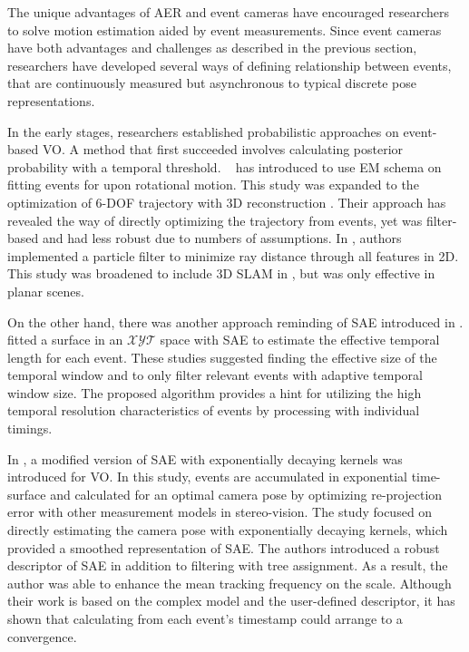 The unique advantages of \ac{AER} and event cameras have encouraged researchers to solve motion estimation aided by event measurements. Since event cameras have both advantages and challenges as described in the previous section, researchers have developed several ways of defining relationship between events, that are continuously measured but asynchronous to typical discrete pose representations.

In the early stages, researchers established probabilistic approaches on event-based \ac{VO}. A method that first succeeded involves calculating posterior probability with a temporal threshold. \citeauthor{kim2008simultaneous}~\cite{kim2008simultaneous} has introduced to use \ac{EM} schema on fitting events for upon rotational motion. This study was expanded to the optimization of 6-\ac{DOF} trajectory with 3D reconstruction \cite{kim2016real}. Their approach has revealed the way of directly optimizing the trajectory from events, yet was filter-based and had less robust due to numbers of assumptions. In \cite{weikersdorfer2012event}, authors implemented a particle filter to minimize ray distance through all features in 2D. This study was broadened to include 3D \ac{SLAM} in \cite{weikersdorfer2013simultaneous}, but was only effective in planar scenes.

On the other hand, there was another approach reminding of \ac{SAE} introduced in \cite{adelson1985spatiotemporal}. \cite{mueggler2015lifetime} fitted a surface in an $\mathcal{XYT}$ space with \ac{SAE} to estimate the effective temporal length for each event. These studies suggested finding the effective size of the temporal window and to only filter relevant events with adaptive temporal window size. The proposed algorithm provides a hint for utilizing the high temporal resolution characteristics of events by processing with individual timings.

In \cite{ieng2018neuromorphic}, a modified version of \ac{SAE} with exponentially decaying kernels was introduced for \ac{VO}. In this study, events are accumulated in exponential time-surface and calculated for an optimal camera pose by optimizing re-projection error with other measurement models in stereo-vision. The study focused on directly estimating the camera pose with exponentially decaying kernels, which provided a smoothed representation of \ac{SAE}. The authors introduced a robust descriptor of \ac{SAE} in addition to filtering with tree assignment. As a result, the author was able to enhance the mean tracking frequency on the scale. Although their work is based on the complex model and the user-defined descriptor, it has shown that calculating from each event's timestamp could arrange to a convergence.

